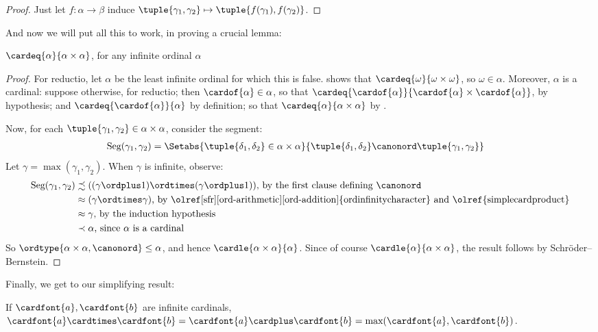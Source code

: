 \documentclass[../../../include/open-logic-section]{subfiles}
\begin{document}
\begin{proof}
	Just let $f \colon \alpha \to \beta$ induce $\tuple{\gamma_1, \gamma_2} \mapsto \tuple{f(\gamma_1), f(\gamma_2)}$.
\end{proof}\noindent
And now we will put all this to work, in proving a crucial lemma:
\begin{lem}$\cardeq{\alpha}{\alpha \times \alpha}$, for any infinite ordinal $\alpha$
\end{lem}
\begin{proof}
	For reductio, let $\alpha$ be the least infinite ordinal for which this is false.  shows that $\cardeq{\omega}{\omega\times\omega}$, so $\omega \in \alpha$. Moreover, $\alpha$ is a cardinal: suppose otherwise, for reductio; then $\cardof{\alpha} \in \alpha$, so that $\cardeq{\cardof{\alpha}}{\cardof{\alpha} \times \cardof{\alpha}}$, by hypothesis; and $\cardeq{\cardof{\alpha}}{\alpha}$ by definition; so that $\cardeq{\alpha}{\alpha\times\alpha}$ by  . 
	
	Now, for each $\tuple{\gamma_1, \gamma_2} \in \alpha \times \alpha$, consider the segment:
	\begin{align*}
		\text{Seg}(\gamma_1, \gamma_2) &= \Setabs{\tuple{\delta_1, \delta_2} \in \alpha \times \alpha}{\tuple{\delta_1, \delta_2} \canonord \tuple{\gamma_1, \gamma_2}}
	\end{align*}
	Let $\gamma = \max(\gamma_1, \gamma_2)$. When $\gamma$ is infinite, observe:
	\begin{align*}
		\text{Seg}(\gamma_1, \gamma_2) & \precsim ((\gamma \ordplus 1)\ordtimes (\gamma \ordplus 1))\text{, by the first clause defining $\canonord$}\\
		&\approx (\gamma \ordtimes \gamma)\text{, by \olref[sfr][ord-arithmetic][ord-addition]{ordinfinitycharacter} and \olref{simplecardproduct}}\\
		&\approx \gamma \text{, by the induction hypothesis}\\
		& \prec \alpha\text{, since $\alpha$ is a cardinal}
	\end{align*}
	So $\ordtype{\alpha\times \alpha, \canonord} \leq \alpha$, and hence $\cardle{\alpha \times \alpha}{\alpha}$. Since of course $\cardle{\alpha}{\alpha \times \alpha}$, the result follows by Schr\"oder--Bernstein. 
\end{proof}\noindent
Finally, we get to our simplifying result:
\begin{thm}If $\cardfont{a}, \cardfont{b}$ are infinite cardinals, $\cardfont{a} \cardtimes \cardfont{b} = \cardfont{a} \cardplus \cardfont{b} =  \text{max}(\cardfont{a}, \cardfont{b})$.
\end{thm}
\end{document}
